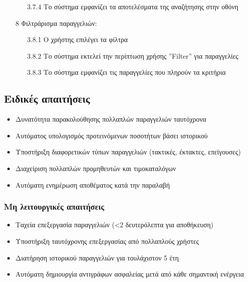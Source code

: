 \documentclass[12pt,a4paper,twoside]{book}
\begin{document}
\begin{enumerate}
\begin{enumerate}
          \item[3.7.4 ] Το σύστημα εμφανίζει τα αποτελέσματα της αναζήτησης στην οθόνη
        \end{enumerate}
  \item[8 ] Φιλτράρισμα παραγγελιών:
        \begin{enumerate}
          \item[3.8.1 ] Ο χρήστης επιλέγει τα φίλτρα %
          \item[3.8.2 ] Το σύστημα εκτελεί την περίπτωση χρήσης ”Filter” για παραγγελίες
          \item[3.8.3 ] Το σύστημα εμφανίζει τις παραγγελίες που πληρούν τα κριτήρια
        \end{enumerate}
\end{enumerate}

\subsection{Ειδικές απαιτήσεις} %
\begin{itemize}
  \item Δυνατότητα παρακολούθησης πολλαπλών παραγγελιών ταυτόχρονα
  \item Αυτόματος υπολογισμός προτεινόμενων ποσοτήτων βάσει ιστορικού
  \item Υποστήριξη διαφορετικών τύπων παραγγελιών (τακτικές, έκτακτες, επείγουσες) %
  \item Διαχείριση πολλαπλών προμηθευτών και τιμοκαταλόγων
  \item Αυτόματη ενημέρωση αποθέματος κατά την παραλαβή
\end{itemize}

\subsubsection{Μη λειτουργικές απαιτήσεις}
\begin{itemize}
  \item Ταχεία επεξεργασία παραγγελιών (<2 δευτερόλεπτα για αποθήκευση) %
  \item Υποστήριξη ταυτόχρονης επεξεργασίας από πολλαπλούς χρήστες
  \item Διατήρηση ιστορικού παραγγελιών για τουλάχιστον 5 έτη
  \item Αυτόματη δημιουργία αντιγράφων ασφαλείας μετά από κάθε σημαντική ενέργεια %
\end{itemize}
\end{document}
